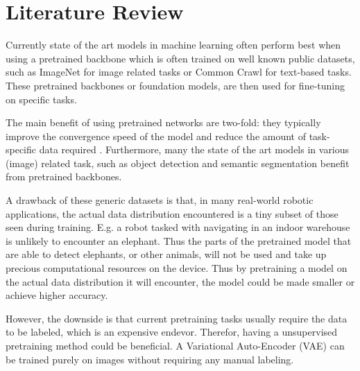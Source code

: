 \chapter{Literature Review}
Currently state of the art models in machine learning often perform best when using a pretrained backbone which is often trained on well known public datasets, such as ImageNet \cite{deng2009imagenet} for image related tasks or Common Crawl \cite{commoncrawl} for text-based tasks. These pretrained backbones or foundation models, are then used for fine-tuning on specific tasks. 

The main benefit of using pretrained networks are two-fold: they typically improve the convergence speed of the model and reduce the amount of task-specific data required \cite{donahue2014decaf,zeiler2014visualizing}. Furthermore, many the state of the art models in various (image) related task, such as object detection\cite{liu2016ssd,redmon2016you} and semantic segmentation \cite{orsic2019defense,girshick2014rich} benefit from pretrained backbones.

A drawback of these generic datasets is that, in many real-world robotic applications, the actual data distribution encountered is a tiny subset of those seen during training. E.g. a robot tasked with navigating in an indoor warehouse is unlikely to encounter an elephant. Thus the parts of the pretrained model that are able to detect elephants, or other animals, will not be used and take up precious computational resources on the device. Thus by pretraining a model on the actual data distribution it will encounter, the model could be made smaller or achieve higher accuracy.

However, the downside is that current pretraining tasks usually require the data to be labeled, which is an expensive endevor. Therefor, having a unsupervised pretraining method could be beneficial. A Variational Auto-Encoder (VAE) can be trained purely on images without requiring any manual labeling.

